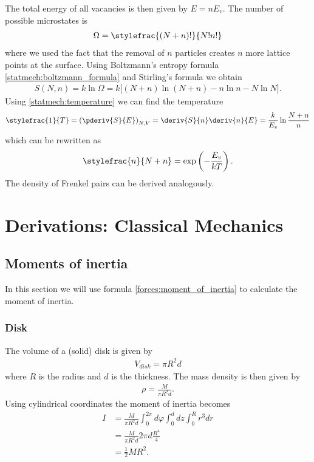     The total energy of all vacancies is then given by $E = nE_v$. The number of possible microstates is
    \begin{gather}
        \Omega = \stylefrac{(N+n)!}{N!n!}
    \end{gather}
    where we used the fact that the removal of $n$ particles creates $n$ more lattice points at the surface. Using Boltzmann's entropy formula \ref{statmech:boltzmann_formula} and Stirling's formula we obtain
    \begin{gather}
        S(N, n) = k\ln\Omega = k\big[(N+n)\ln(N+n) -n\ln n - N\ln N \big].
    \end{gather}
    Using \ref{statmech:temperature} we can find the temperature
    \begin{gather}
        \stylefrac{1}{T} = \left(\pderiv{S}{E}\right)_{N, V} = \deriv{S}{n}\deriv{n}{E} = \frac{k}{E_v}\ln\frac{N+n}{n}
    \end{gather}
    which can be rewritten as
    \begin{gather}
        \stylefrac{n}{N + n} = \exp\left(-\frac{E_v}{kT}\right).
    \end{gather}
    The density of Frenkel pairs can be derived analogously.

\chapter{Derivations: Classical Mechanics}

\section{Moments of inertia}\label{deriv:inertia}

    In this section we will use formula \ref{forces:moment_of_inertia} to calculate the moment of inertia.

\subsection{Disk}

    The volume of a (solid) disk is given by
    \begin{gather}
        V_{disk} = \pi R^2d
    \end{gather}
    where $R$ is the radius and $d$ is the thickness. The mass density is then given by
    \begin{gather}
        \rho = \frac{M}{\pi R^2d}.
    \end{gather}
    Using cylindrical coordinates the moment of inertia becomes
    \begin{align}
        I &= \frac{M}{\pi R^2d}\int_0^{2\pi}d\varphi\int_0^ddz\int_0^Rr^3dr\\
        &= \frac{M}{\pi R^2d}2\pi d\frac{R^4}{4}\\
        &= \frac{1}{2}MR^2.
    \end{align}

